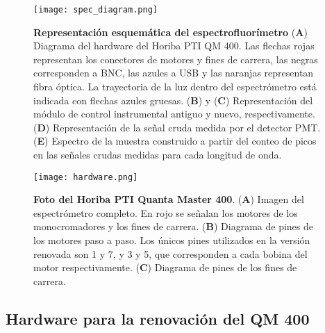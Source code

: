 \begin{figure}[btp]
     \centering
     \texttt{[image: spec\_diagram.png]}
     \caption{
     \textbf{Representación esquemática del espectrofluorímetro}
     (\textbf{A}) Diagrama del hardware del Horiba PTI QM 400. Las flechas rojas representan los conectores de motores y fines de carrera, las negras corresponden a BNC, las azules a USB y las naranjas representan fibra óptica. La trayectoria de la luz dentro del espectrómetro está indicada con flechas azules gruesas.
     (\textbf{B}) y (\textbf{C}) Representación del módulo de control instrumental antiguo y nuevo, respectivamente.
     (\textbf{D}) Representación de la señal cruda medida por el detector PMT.
     (\textbf{E}) Espectro de la muestra construido a partir del conteo de picos en las señales crudas medidas para cada longitud de onda.
    }
     \label{fig:ref-diagram}
\end{figure}

\begin{figure}[h]
     \centering
     \texttt{[image: hardware.png]}
     \caption{\textbf{Foto del Horiba PTI Quanta Master 400}. 
    (\textbf{A}) Imagen del espectrómetro completo. En rojo se señalan los motores de los monocromadores y los fines de carrera. (\textbf{B}) Diagrama de pines de los motores paso a paso. Los únicos pines utilizados en la versión renovada son 1 y 7, y 3 y 5, que corresponden a cada bobina del motor respectivamente. (\textbf{C}) Diagrama de pines de los fines de carrera.}
     \label{fig:hardware}
\end{figure}



\subsection{Hardware para la renovación del QM 400}


